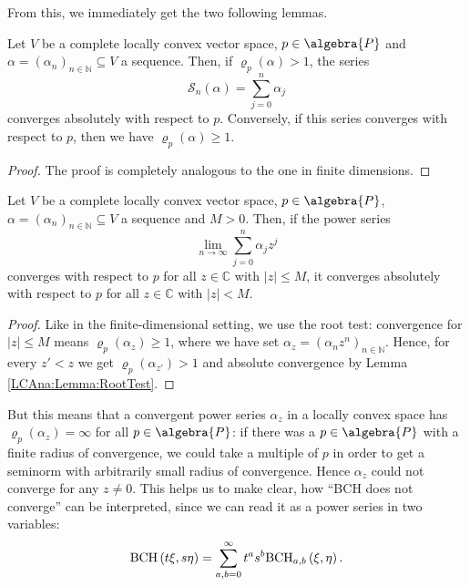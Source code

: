 From this, we immediately get the two following lemmas.
\begin{lemma}
	\label{LCAna:Lemma:RootTest}
	Let $V$ be a complete locally convex vector space, $p \in \algebra{P}$ 
	and $\alpha = (\alpha_n)_{n \in \mathbb{N}} \subseteq V$ a sequence. 
	Then, if $\varrho_p(\alpha) > 1$, the series
	\begin{equation*}
		\mathcal{S}_n(\alpha)
		=
		\sum\limits_{j = 0}^n
		\alpha_j
	\end{equation*}
	converges absolutely with respect to $p$. Conversely, if this
	series converges with respect to $p$, then we have 
	$\varrho_p(\alpha) \geq 1$.	
\end{lemma}
\begin{proof}
	The proof is completely analogous to the one in finite dimensions.
\end{proof}
\begin{lemma}
	\label{LCAna:Lemma:PowerSeriesConvAbs}
	Let $V$ be a complete locally convex vector space, $p \in \algebra{P}$, 
	$\alpha = (\alpha_n)_{n \in \mathbb{N}} \subseteq V$ a sequence and
	$M > 0$. Then, if the power series
	\begin{equation*}
		\lim_{n \longrightarrow \infty}
		\sum\limits_{j = 0}^n
		\alpha_j z^j
	\end{equation*}
	converges with respect to $p$ for all $z \in \mathbb{C}$ with $|z| \leq M$, 
	it converges absolutely with respect to $p$ for all $z \in \mathbb{C}$ with 
	$|z| < M$.
\end{lemma}
\begin{proof}
	Like in the finite-dimensional setting, we use the root test: convergence 
	for $|z| \leq M$ means $\varrho_p(\alpha_z) \geq 1$, where we have set 
	$\alpha_z = (\alpha_n z^n)_{n \in \mathbb{N}}$. Hence, for every $z' < z$ 
	we get $\varrho_p(\alpha_{z'}) > 1$ and absolute convergence by Lemma 
	\ref{LCAna:Lemma:RootTest}.
\end{proof}
But this means that a convergent power series $\alpha_z$ in a locally convex space  
has $\varrho_p(\alpha_z) = \infty$ for all $p \in \algebra{P}$: if there was a $p 
\in \algebra{P}$ with a finite radius of convergence, we could take a multiple 
of $p$ in order to get a seminorm with arbitrarily small radius of convergence. 
Hence $\alpha_z$ could not converge for any $z \neq 0$. This helps us to make 
clear, how ``BCH does not converge'' can be interpreted, since we can read it 
as a power series in two variables:
\begin{equation*}
	\mathrm{BCH}\left(t \xi, s \eta\right)
	=
	\sum\limits_{a,b = 0}^{\infty}
	t^a s^b
	\mathrm{BCH}_{a, b}\left(\xi, \eta\right).
\end{equation*}
